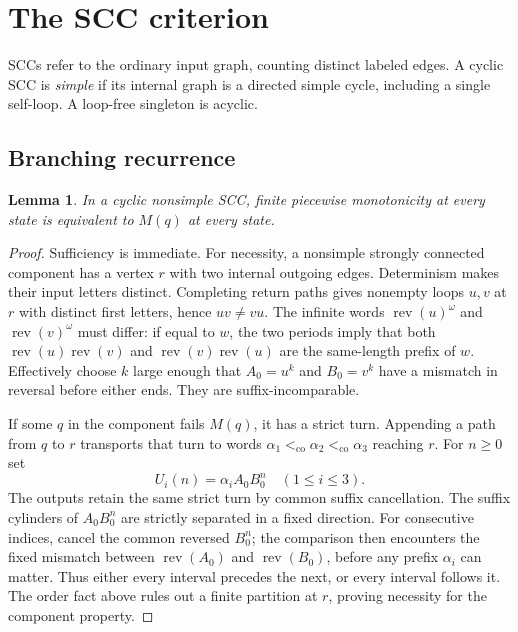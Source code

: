 \documentclass[acmsmall,screen,nonacm,11pt]{acmart}
\newcommand{\co}{\mathrel{<_{\mathrm{co}}}}
\newcommand{\rev}{\operatorname{rev}}
\newtheorem{lemma}[theorem]{Lemma}
\theoremstyle{definition}
\begin{document}
\section{The SCC criterion}\label{sec:scc}

SCCs refer to the ordinary input graph, counting distinct labeled edges.
A cyclic SCC is \emph{simple} if its internal graph is a directed simple
cycle, including a single self-loop. A loop-free singleton is acyclic.

\subsection{Branching recurrence}

\begin{lemma}\label{lem:branch}
In a cyclic nonsimple SCC, finite piecewise monotonicity at every state is
equivalent to $M(q)$ at every state.
\end{lemma}
\begin{proof}
Sufficiency is immediate. For necessity, a nonsimple strongly connected
component has a vertex $r$ with two internal outgoing edges. Determinism
makes their input letters distinct. Completing return paths gives nonempty
loops $u,v$ at $r$ with distinct first letters, hence $uv\ne vu$.
The infinite words $\rev(u)^\omega$ and $\rev(v)^\omega$ must differ:
if equal to $w$, the two periods imply that both
$\rev(u)\rev(v)$ and $\rev(v)\rev(u)$ are the same-length prefix of $w$.
Effectively choose $k$ large enough that $A_0=u^k$ and $B_0=v^k$ have a
mismatch in reversal before either ends. They are suffix-incomparable.

If some $q$ in the component fails $M(q)$, it has a strict turn. Appending
a path from $q$ to $r$ transports that turn to words
$\alpha_1\co\alpha_2\co\alpha_3$ reaching $r$. For $n\geq0$ set
\begin{equation}\label{eq:branchpump}
 U_i(n)=\alpha_i A_0B_0^n\quad(1\leq i\leq3).
\end{equation}
The outputs retain the same strict turn by common suffix cancellation.
The suffix cylinders of $A_0B_0^n$ are strictly separated in a fixed direction.
For consecutive indices, cancel the common reversed $B_0^n$; the comparison
then encounters the fixed mismatch between $\rev(A_0)$ and $\rev(B_0)$,
before any prefix $\alpha_i$ can matter. Thus either every interval precedes
the next, or every interval follows it. The order fact above rules out a
finite partition at $r$, proving necessity for the component property.
\end{proof}
\end{document}
